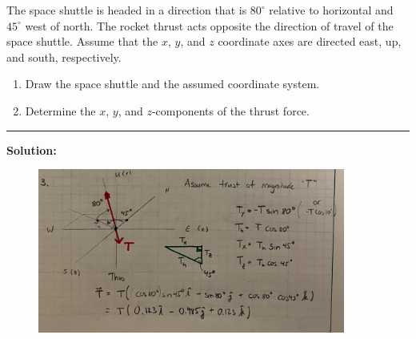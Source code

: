 
The space shuttle is headed in a direction that is $80^\circ$ relative to horizontal and $45^\circ$ west of north. The rocket thrust acts opposite the direction of travel of the space shuttle. Assume that the $x$, $y$, and $z$ coordinate axes are directed east, up, and south, respectively. 
\begin{enumerate}
  \item Draw the space shuttle and the assumed coordinate system.
  \item Determine the $x$, $y$, and $z$-components of the thrust force.
\end{enumerate}

\vspace{.5cm}
\rule{\textwidth}{.4pt}
\vspace{.5cm}
\textbf{Solution:}
\begin{figure}[ht!]
  \centering
  \includegraphics[width=0.9\textwidth,
	           height=0.4\textheight,
		   keepaspectratio]{soln.png}
\end{figure}

